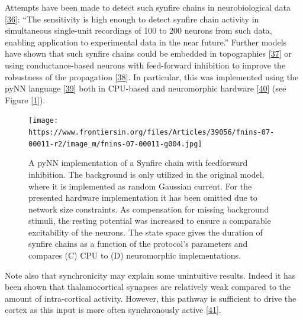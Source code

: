 Attempts have been made to detect such synfire chains in neurobiological data {[}\protect\hyperlink{ref-qVu1OkoS}{36}{]}: ``The sensitivity is high enough to detect synfire chain activity in simultaneous single-unit recordings of 100 to 200 neurons from such data, enabling application to experimental data in the near future.'' Further models have shown that such synfire chains could be embedded in topographies {[}\protect\hyperlink{ref-xBZqHOuN}{37}{]} or using conductance-based neurons with feed-forward inhibition to improve the robustness of the propagation {[}\protect\hyperlink{ref-p7xk5w4f}{38}{]}. In particular, this was implemented using the pyNN language {[}\protect\hyperlink{ref-33SRV9MB}{39}{]} both in CPU-based and neuromorphic hardware {[}\protect\hyperlink{ref-DiIieN8s}{40}{]} (see Figure {[}\ref{fig:pynn}{]}).

\begin{figure}
\hypertarget{fig:pynn}{%
\centering
\texttt{[image: https://www.frontiersin.org/files/Articles/39056/fnins-07-00011-r2/image\_m/fnins-07-00011-g004.jpg]}
\caption{A pyNN implementation of a Synfire chain with feedforward inhibition. The background is only utilized in the original model, where it is implemented as random Gaussian current. For the presented hardware implementation it has been omitted due to network size constraints. As compensation for missing background stimuli, the resting potential was increased to ensure a comparable excitability of the neurons. The state space gives the duration of synfire chains as a function of the protocol's parameters and compares (C) CPU to (D) neuromorphic implementations.}\label{fig:pynn}
}
\end{figure}

Note also that synchronicity may explain some unintuitive results. Indeed it has been shown that thalamocortical synapses are relatively weak compared to the amount of intra-cortical activity. However, this pathway is sufficient to drive the cortex as this input is more often synchronously active {[}\protect\hyperlink{ref-18ZU9zP9l}{41}{]}.

